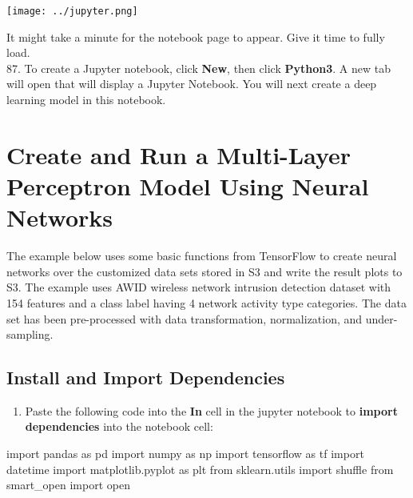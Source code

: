 \documentclass[]{book}
\newenvironment{Shaded}{\begin{snugshade}}{\end{snugshade}}
\newcommand{\ImportTok}[1]{#1}
\newcommand{\BuiltInTok}[1]{#1}
\newcommand{\NormalTok}[1]{#1}
\providecommand{\tightlist}{%
  \setlength{\itemsep}{0pt}\setlength{\parskip}{0pt}}
\begin{document}
\texttt{[image: ../jupyter.png]}

It might take a minute for the notebook page to appear. Give it time to fully load.\\
87. To create a Jupyter notebook, click \textbf{New}, then click \textbf{Python3}. A new tab will open that will display a Jupyter Notebook. You will next create a deep learning model in this notebook.

\hypertarget{create-and-run-a-multi-layer-perceptron-model-using-neural-networks}{%
\chapter{Create and Run a Multi-Layer Perceptron Model Using Neural Networks}\label{create-and-run-a-multi-layer-perceptron-model-using-neural-networks}}

The example below uses some basic functions from TensorFlow to create neural networks over the customized data sets stored in S3 and write the result plots to S3. The example uses AWID wireless network intrusion detection dataset with 154 features and a class label having 4 network activity type categories. The data set has been pre-processed with data transformation, normalization, and under-sampling.

\hypertarget{install-and-import-dependencies}{%
\section{Install and Import Dependencies}\label{install-and-import-dependencies}}

\begin{enumerate}
\def\labelenumi{\arabic{enumi}.}
\setcounter{enumi}{87}
\tightlist
\item
  Paste the following code into the \textbf{In} cell in the jupyter notebook to \textbf{import dependencies} into the notebook cell:
\end{enumerate}

\begin{Shaded}
\begin{Highlighting}[]
\ImportTok{import}\NormalTok{ pandas }\ImportTok{as}\NormalTok{ pd}
\ImportTok{import}\NormalTok{ numpy }\ImportTok{as}\NormalTok{ np}
\ImportTok{import}\NormalTok{ tensorflow }\ImportTok{as}\NormalTok{ tf}
\ImportTok{import}\NormalTok{ datetime}
\ImportTok{import}\NormalTok{ matplotlib.pyplot }\ImportTok{as}\NormalTok{ plt}
\ImportTok{from}\NormalTok{ sklearn.utils }\ImportTok{import}\NormalTok{ shuffle}
\ImportTok{from}\NormalTok{ smart_open }\ImportTok{import} \BuiltInTok{open}
\end{Highlighting}
\end{Shaded}
\end{document}
